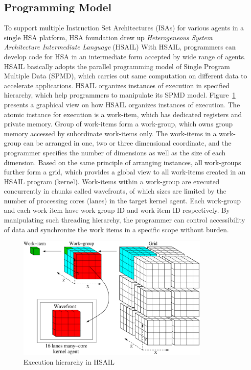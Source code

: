         \subsection{Programming Model}
        To support multiple Instruction Set Architectures (ISAs) for various agents in a single HSA platform,
        HSA foundation drew up \textit{Heterogeneous System Architecture Intermediate Language} (HSAIL)
        With HSAIL, programmers can develop code for HSA in an intermediate form accepted by wide range of agents.
        HSAIL basically adopts the parallel programming model of Single Program Multiple Data (SPMD), 
        which carries out same computation on different data to accelerate applications.
        HSAIL organizes instances of execution in specified hierarchy, which help programmers to manipulate its SPMD model.
        Figure~\ref{fig:grid} presents a graphical view on how HSAIL organizes instances of execution.
        The atomic instance for execution is a work-item, which has dedicated registers and private memory.
        Group of work-items form a work-group, which owns group memory accessed by subordinate work-items only.
        The work-items in a work-group can be arranged in one, two or three dimensional coordinate, 
        and the programmer specifies the number of dimensions as well as the size of each dimension.
        Based on the same principle of arranging instances, all work-groups further form a grid, 
        which provides a global view to all work-items created in an HSAIL program (kernel).
        Work-items within a work-group are executed concurrently in chunks called wavefronts, 
        of which sizes are limited by the number of processing cores (lanes) in the target kernel agent.
        Each work-group and each work-item have work-group ID and work-item ID respectively.
        By manipulating such threading hierarchy, 
        the programmer can control accessibility of data and synchronize the work items in a specific scope without burden.
        \vspace{\textfig}
        \begin{figure}[!ht] 
            \centering
            \includegraphics[width=0.85\textwidth]{./figs/grid.eps}
            \caption{Execution hierarchy in HSAIL}
            \label{fig:grid}
        \end{figure}
